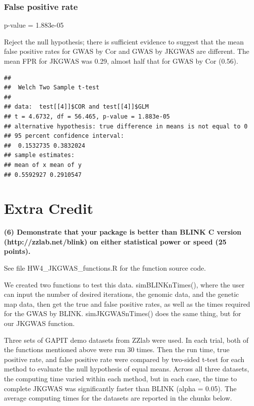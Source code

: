 \documentclass[
]{article}
\newenvironment{Shaded}{\begin{snugshade}}{\end{snugshade}}
\newcommand{\DataTypeTok}[1]{\textcolor[rgb]{0.13,0.29,0.53}{#1}}
\newcommand{\DecValTok}[1]{\textcolor[rgb]{0.00,0.00,0.81}{#1}}
\newcommand{\KeywordTok}[1]{\textcolor[rgb]{0.13,0.29,0.53}{\textbf{#1}}}
\newcommand{\NormalTok}[1]{#1}
\newcommand{\OperatorTok}[1]{\textcolor[rgb]{0.81,0.36,0.00}{\textbf{#1}}}
\begin{document}
\hypertarget{false-positive-rate}{%
\subsubsection{False positive rate}\label{false-positive-rate}}

p-value = 1.883e-05

Reject the null hypothesis; there is sufficient evidence to suggest that
the mean false positive rates for GWAS by Cor and GWAS by JKGWAS are
different. The mean FPR for JKGWAS was 0.29, almost half that for GWAS
by Cor (0.56).

\begin{Shaded}
\end{Shaded}

\begin{verbatim}
## 
##  Welch Two Sample t-test
## 
## data:  test[[4]]$COR and test[[4]]$GLM
## t = 4.6732, df = 56.465, p-value = 1.883e-05
## alternative hypothesis: true difference in means is not equal to 0
## 95 percent confidence interval:
##  0.1532735 0.3832024
## sample estimates:
## mean of x mean of y 
## 0.5592927 0.2910547
\end{verbatim}

\hypertarget{extra-credit}{%
\section{Extra Credit}\label{extra-credit}}

\textbf{(6) Demonstrate that your package is better than BLINK C version (http://zzlab.net/blink) on either statistical power or speed (25 points). }

See file HW4\_JKGWAS\_functions.R for the function source code.

We created two functions to test this data. simBLINKnTimes(), where the
user can input the number of desired iterations, the genomic data, and
the genetic map data, then get the true and false positive rates, as
well as the times required for the GWAS by BLINK. simJKGWASnTimes() does
the same thing, but for our JKGWAS function.

Three sets of GAPIT demo datasets from ZZlab were used. In each trial,
both of the functions mentioned above were run 30 times. Then the run
time, true positive rate, and false positive rate were compared by
two-sided t-test for each method to evaluate the null hypothesis of
equal means. Across all three datasets, the computing time varied within
each method, but in each case, the time to complete JKGWAS was
significantly faster than BLINK (alpha = 0.05). The average computing
times for the datasets are reported in the chunks below.
\end{document}

